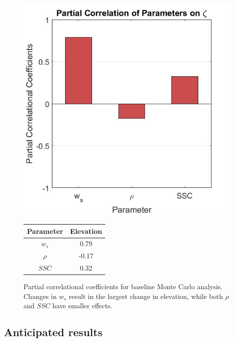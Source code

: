 \documentclass{wscpaperproc}
\theoremstyle{wsc}
\begin{document}
\begin{figure}
	\begin{minipage}{0.49\linewidth}
		\centering
		\includegraphics[width=\textwidth]{../figures/sens_mc.jpg}
	\end{minipage}
	\hfill
	\begin{minipage}{0.49\linewidth}
		\centering
		\setlength\tabcolsep{0pt}
		\setlength\tabcolsep{20px}
		\begin{tabular}{cc}
			\hline
			Parameter & Elevation \\ \hline
			$w_s$     & 0.79      \\
			$\rho$    & -0.17     \\
			$SSC$     & 0.32      \\ \hline
		\end{tabular}
	\end{minipage}
	\caption[Partial correlational coefficients of the sediment model]{\label{fig:mc_partial_corr} Partial correlational coefficients for baseline Monte Carlo analysis. Changes in $w_s$ result in the largest change in elevation, while both $\rho$ and $SSC$ have smaller effects.}
\end{figure}

\subsection{Anticipated results}
\end{document}
